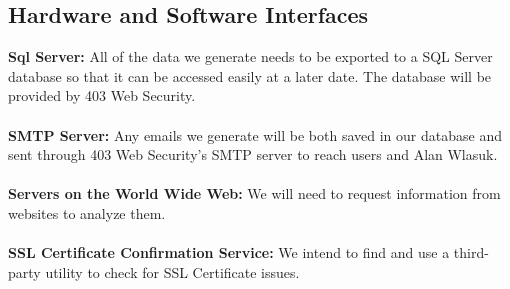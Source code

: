 \subsection{Hardware and Software Interfaces}
\textbf{Sql Server: } All of the data we generate needs to be exported to a SQL Server database so that it can be accessed easily at a later date. The database will be provided by 403 Web Security.
\\
\\
\textbf{SMTP Server: } Any emails we generate will be both saved in our database and sent through 403 Web Security's SMTP server to reach users and Alan Wlasuk.
\\
\\
\textbf{Servers on the World Wide Web: } We will need to request information from websites to analyze them. 
\\
\\
\textbf{SSL Certificate Confirmation Service: } We intend to find and use a third-party utility to check for SSL Certificate issues.